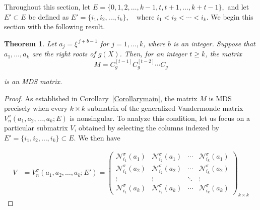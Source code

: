 \documentclass[11pt]{article}
\newtheorem{theorem}{Theorem}
\begin{document}
Throughout this section, 
let  
\(
E = \{0, 1, 2, \dots, k-1, t, t+1, \dots, k+t-1\},
\)
and let $E' \subset E$ be defined as  
\(
E' = \{i_1, i_2, \dots, i_k\}, \quad \text{where } i_1 < i_2 < \cdots < i_k.
\)
We begin this section with the following result.


\begin{theorem}\label{Theorem 7}   
Let $a_j = \xi^{\,j + b - 1}$ for $j = 1, \dots, k$, where $b$ is an integer. 
Suppose that $a_1, \dots, a_k$ are the right roots of $g(X)$. Then, for an integer 
$t \geq k$, the matrix 
\[
M = C_g^{[t-1]} C_g^{[t-2]} \cdots C_g
\] 

is an \textup{MDS} matrix.
\end{theorem}

 \begin{proof} 
	As established in Corollary~\ref{Corollarymain}, the matrix $M$ is \textup{MDS} precisely when every $k \times k$ submatrix of the generalized Vandermonde matrix $V^\sigma_n(a_1,a_2,\dots,a_k;E)$ is nonsingular. To analyze this condition, let us focus on a particular submatrix $V$, obtained by selecting the columns indexed by $E' = \{i_1,i_2,\dots,i_k\} \subset E$. We then have

    \begin{align}\label{EQN12}
        V
        &=V^\sigma_n(a_1,a_2,\dots,a_k;E') 
		= \begin{pmatrix} 
			\mathcal{N}^\sigma_{i_1}(a_1) & \mathcal{N}^\sigma_{i_2}(a_1) & \cdots & \mathcal{N}^\sigma_{i_k}(a_1) \\ 
			\mathcal{N}^\sigma_{i_1}(a_2) & \mathcal{N}^\sigma_{i_2}(a_2) & \cdots & \mathcal{N}^\sigma_{i_k}(a_2) \\ 
			\vdots       & \vdots       & \ddots & \vdots       \\ 
			\mathcal{N}^\sigma_{i_1}(a_k) & \mathcal{N}^\sigma_{i_2}(a_k) & \cdots & \mathcal{N}^\sigma_{i_k}(a_k) 
		\end{pmatrix}_{k\times k}
    \end{align}
    



\end{proof}
\end{document}
